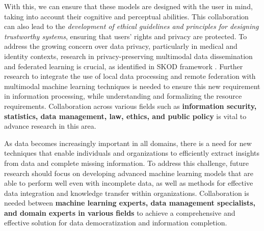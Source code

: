 With this, we can ensure that these models are designed with the user in mind, taking into account their cognitive and perceptual abilities. This collaboration can also lead to the \textit{development of ethical guidelines and principles for designing trustworthy systems}, ensuring that users' rights and privacy are protected.
To address the growing concern over data privacy, particularly in medical and identity contexts, research in privacy-preserving multimodal data dissemination and federated learning is crucial, as identified in SKOD framework \cite{palacios2019wip}. Further research to integrate the use of local data processing and remote federation with multimodal machine learning techniques is needed to ensure this new requirement in information processing, while understanding and formalizing the resource requirements. 
Collaboration across various fields such as \textbf{information security, statistics, data management, law, ethics, and public policy} is vital to advance research in this area.



As data becomes increasingly important in all domains, there is a need for new techniques that enable individuals and organizations to efficiently extract insights from data and complete missing information. To address this challenge, future research should focus on developing advanced machine learning models that are able to perform well even with incomplete data, as well as methods for effective data integration and knowledge transfer within organizations. Collaboration is needed between \textbf{machine learning experts, data management specialists, and domain experts in various fields} to achieve a comprehensive and effective solution for data democratization and information completion.


